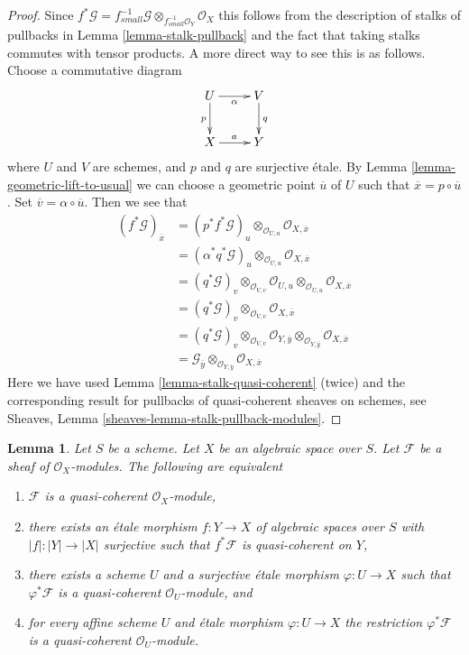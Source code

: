 \documentclass{stacks-project}
\theoremstyle{plain}
\newtheorem{lemma}[subsection]{Lemma}
\theoremstyle{definition}
\theoremstyle{remark}
\numberwithin{equation}{subsection}
\begin{document}
\begin{proof}
Since $f^*\mathcal{G} =
f_{small}^{-1}\mathcal{G} \otimes_{f_{small}^{-1}\mathcal{O}_Y} \mathcal{O}_X$
this follows from the description of stalks of pullbacks in
Lemma \ref{lemma-stalk-pullback}
and the fact that taking stalks commutes with tensor products.
A more direct way to see this is as follows.
Choose a commutative diagram
$$
\xymatrix{
U \ar[d]_p \ar[r]_\alpha  & V \ar[d]^q \\
X \ar[r]^a & Y
}
$$
where $U$ and $V$ are schemes, and $p$ and $q$ are surjective \'etale.
By
Lemma \ref{lemma-geometric-lift-to-usual}
we can choose a geometric point $\overline{u}$ of $U$ such that
$\overline{x} = p \circ \overline{u}$. Set
$\overline{v} = \alpha \circ \overline{u}$.
Then we see that
\begin{align*}
(f^*\mathcal{G})_{\overline{x}} & =
(p^*f^*\mathcal{G})_u \otimes_{\mathcal{O}_{U, u}}
\mathcal{O}_{X, \overline{x}} \\
& = (\alpha^*q^*\mathcal{G})_u \otimes_{\mathcal{O}_{U, u}}
\mathcal{O}_{X, \overline{x}} \\
& = (q^*\mathcal{G})_v \otimes_{\mathcal{O}_{V, v}}
\mathcal{O}_{U, u} \otimes_{\mathcal{O}_{U, u}}
\mathcal{O}_{X, \overline{x}} \\
& = (q^*\mathcal{G})_v \otimes_{\mathcal{O}_{V, v}}
\mathcal{O}_{X, \overline{x}} \\
& = (q^*\mathcal{G})_v \otimes_{\mathcal{O}_{V, v}}
\mathcal{O}_{Y, \overline{y}} \otimes_{\mathcal{O}_{Y, \overline{y}}}
\mathcal{O}_{X, \overline{x}} \\
& = \mathcal{G}_{\overline{y}} \otimes_{\mathcal{O}_{Y, \overline{y}}}
\mathcal{O}_{X, \overline{x}}
\end{align*}
Here we have used
Lemma \ref{lemma-stalk-quasi-coherent} (twice)
and the corresponding result for pullbacks of quasi-coherent sheaves
on schemes, see
Sheaves, Lemma \ref{sheaves-lemma-stalk-pullback-modules}.
\end{proof}

\begin{lemma}
\label{lemma-characterize-quasi-coherent}
Let $S$ be a scheme. Let $X$ be an algebraic space over $S$.
Let $\mathcal{F}$ be a sheaf of $\mathcal{O}_X$-modules.
The following are equivalent
\begin{enumerate}
\item $\mathcal{F}$ is a quasi-coherent $\mathcal{O}_X$-module,
\item there exists an \'etale morphism $f : Y \to X$ of
algebraic spaces over $S$ with $|f| : |Y| \to |X|$ surjective
such that $f^*\mathcal{F}$ is quasi-coherent on $Y$,
\item there exists a scheme $U$ and a surjective \'etale morphism
$\varphi : U \to X$ such that $\varphi^*\mathcal{F}$ is a quasi-coherent
$\mathcal{O}_U$-module, and
\item for every affine scheme $U$ and \'etale morphism $\varphi : U \to X$ the
restriction $\varphi^*\mathcal{F}$ is a quasi-coherent $\mathcal{O}_U$-module.
\end{enumerate}
\end{lemma}
\end{document}
